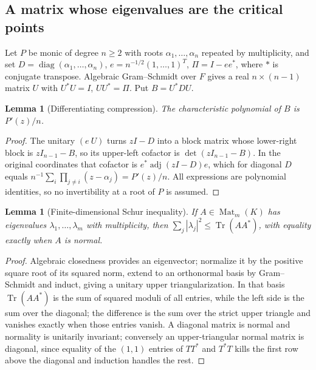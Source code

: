 \documentclass[11pt,letterpaper]{article}
\numberwithin{equation}{section}
\newtheorem{lemma}[theorem]{Lemma}
\theoremstyle{definition}
\theoremstyle{remark}\newtheorem{remark}[theorem]{Remark}
\newcommand{\Tr}{\operatorname{Tr}}
\newcommand{\adj}{\operatorname{adj}}
\begin{document}
\subsection{A matrix whose eigenvalues are the critical points}
Let $P$ be monic of degree $n\ge2$ with roots $\alpha_1,\ldots,\alpha_n$
repeated by multiplicity, and set
$D=\operatorname{diag}(\alpha_1,\ldots,\alpha_n)$,
$e=n^{-1/2}(1,\ldots,1)^T$, $\Pi=I-ee^*$, where $*$ is conjugate transpose.
Algebraic Gram--Schmidt over $F$ gives a real $n\times(n-1)$ matrix $U$ with
$U^*U=I$, $UU^*=\Pi$. Put $B=U^*DU$.

\begin{lemma}[Differentiating compression]\label{polynomial:lem:compression}
The characteristic polynomial of $B$ is $P'(z)/n$.
\end{lemma}
\begin{proof}
The unitary $(e\ U)$ turns $zI-D$ into a block matrix whose lower-right block
is $zI_{n-1}-B$, so its upper-left cofactor is $\det(zI_{n-1}-B)$. In the
original coordinates that cofactor is $e^*\adj(zI-D)e$, which for diagonal $D$
equals $n^{-1}\sum_i\prod_{j\ne i}(z-\alpha_j)=P'(z)/n$. All expressions are
polynomial identities, so no invertibility at a root of $P$ is assumed.
\end{proof}

\begin{lemma}[Finite-dimensional Schur inequality]\label{polynomial:lem:schur}
If $A\in\operatorname{Mat}_m(K)$ has eigenvalues $\lambda_1,\ldots,\lambda_m$
with multiplicity, then $\sum_j|\lambda_j|^2\le\Tr(AA^*)$, with equality
exactly when $A$ is normal.
\end{lemma}
\begin{proof}
Algebraic closedness provides an eigenvector; normalize it by the positive
square root of its squared norm, extend to an orthonormal basis by
Gram--Schmidt and induct, giving a unitary upper triangularization. In that
basis $\Tr(AA^*)$ is the sum of squared moduli of all entries, while the left
side is the sum over the diagonal; the difference is the sum over the strict
upper triangle and vanishes exactly when those entries vanish. A diagonal
matrix is normal and normality is unitarily invariant; conversely an
upper-triangular normal matrix is diagonal, since equality of the $(1,1)$
entries of $TT^*$ and $T^*T$ kills the first row above the diagonal and
induction handles the rest.
\end{proof}
\end{document}
